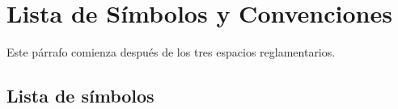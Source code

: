 \newpage
\chapter*{Lista de Símbolos y Convenciones}
\vspace{3\baselineskip}

Este párrafo comienza después de los tres espacios reglamentarios.

\section*{Lista de símbolos}